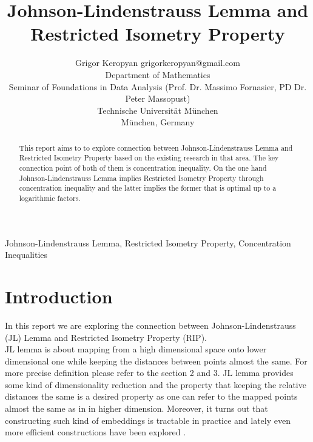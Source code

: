 \documentclass[twoside,11pt]{article}
\begin{document}
\title{Johnson-Lindenstrauss Lemma and Restricted Isometry Property}

\author{\name Grigor Keropyan \email grigorkeropyan@gmail.com \\
      \addr Department of Mathematics\\
      Seminar of Foundations in Data Analysis (Prof. Dr. Massimo Fornasier, PD Dr. Peter Massopust) \\
      Technische Universität München\\
      München, Germany
    }

\maketitle

\begin{abstract}
This report aims to to explore connection between Johnson-Lindenstrauss Lemma and Restricted Isometry Property based on the existing research in that area. The key connection point of both of them is concentration inequality. On the one hand Johnson-Lindenstrauss Lemma implies Restricted Isometry Property through concentration inequality and the latter implies the former that 
is optimal up to a logarithmic factors.  \\
\end{abstract} 

\begin{keywords}
  Johnson-Lindenstrauss Lemma, Restricted Isometry Property, Concentration Inequalities
\end{keywords}

\section{Introduction}

In this report we are exploring the connection between Johnson-Lindenstrauss (JL) Lemma and Restricted Isometry Property (RIP). \\

JL lemma is about mapping from a high dimensional space onto lower dimensional one while keeping the distances between points almost the same. For more precise definition please refer to the section 2 and 3. JL lemma provides some kind of dimensionality reduction and the property that keeping the relative distances the same is a desired property as one can refer to the mapped points almost the same as in in higher dimension. Moreover, it turns out that constructing such kind of embeddings is tractable in practice and lately even more efficient constructions have been explored \citep{Khramer}. \\
\end{document}
